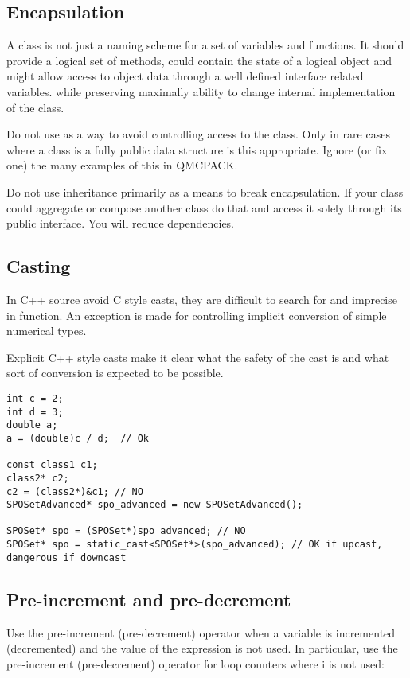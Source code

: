 \subsection{Encapsulation}
A class is not just a naming scheme for a set of variables and functions. It should provide a logical set of methods, could contain the state of a logical object and might allow access to object data through a well defined interface related variables. while preserving maximally ability to change internal implementation of the class.

Do not use  as a way to avoid controlling access to the class. Only in rare cases where a class is a fully public data structure  is this appropriate. Ignore (or fix one) the many examples of this in QMCPACK.

Do not use inheritance primarily as a means to break encapsulation. If your class could aggregate or compose another class do that and access it solely through its public interface. You will reduce dependencies.

\subsection{Casting}
In C++ source avoid C style casts, they are difficult to search for and imprecise in function.
An exception is made for controlling implicit conversion of simple numerical types.

Explicit C++ style casts make it clear what the safety of the cast is and what sort of conversion is expected to be possible.

\begin{lstlisting}
int c = 2;
int d = 3;
double a;
a = (double)c / d;  // Ok

const class1 c1;
class2* c2;
c2 = (class2*)&c1; // NO
SPOSetAdvanced* spo_advanced = new SPOSetAdvanced();

SPOSet* spo = (SPOSet*)spo_advanced; // NO
SPOSet* spo = static_cast<SPOSet*>(spo_advanced); // OK if upcast, dangerous if downcast
\end{lstlisting}

\subsection{Pre-increment and pre-decrement}
Use the pre-increment (pre-decrement) operator when a variable is incremented (decremented) and the value of the expression is not used.
In particular, use the pre-increment (pre-decrement) operator for loop counters where i is not used:


